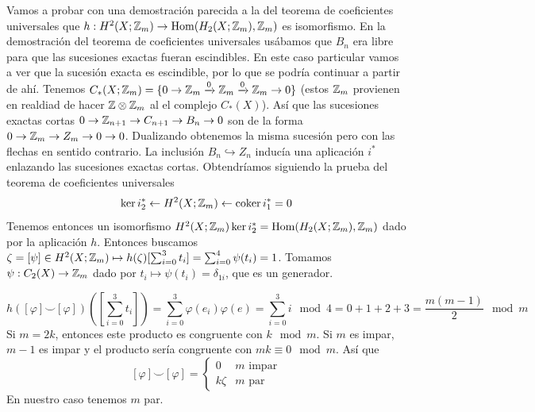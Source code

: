 \documentclass[TA.tex]{subfiles}
\begin{document}
\begin{ej}
Vamos a probar con una demostración parecida a la del teorema de coeficientes universales que $h:H^2(X;\mathbb{Z}_m)\to \operatorname{Hom}(H_2(X;\mathbb{Z}_m),\mathbb{Z}_m)$ es isomorfismo. En la demostración del teorema de coeficientes universales usábamos que $B_n$ era libre para que las sucesiones exactas fueran escindibles. En este caso particular vamos a ver que la sucesión exacta es escindible, por lo que se podría continuar a partir de ahí. Tenemos $C_*(X;\mathbb{Z}_m)=\{0\to \mathbb{Z}_m\xrightarrow{0} \mathbb{Z}_m\xrightarrow{0}\mathbb{Z}_m\to 0\}$ (estos $\mathbb{Z}_m$ provienen en realdiad de hacer $\mathbb{Z}\otimes\mathbb{Z}_m$ al el complejo $C_*(X)$). Así que las sucesiones exactas cortas $0\to\mathbb{Z}_{n+1}\to C_{n+1}\to B_n\to 0$ son de la forma $0\to\mathbb{Z}_m\to Z_m\to 0\to 0$. Dualizando obtenemos la misma sucesión pero con las flechas en sentido contrario. La inclusión $B_n\hookrightarrow Z_n$ inducía una aplicación $i^*$ enlazando las sucesiones exactas cortas. Obtendríamos siguiendo la prueba del teorema de coeficientes universales
\[
\ker i^*_2\leftarrow H^2(X;\mathbb{Z}_m)\leftarrow\operatorname{coker} i_1^*=0
\]
Tenemos entonces un isomorfismo $H^2(X;\mathbb{Z}_m)\ker i^*_2=\operatorname{Hom}(H_2(X;\mathbb{Z}_m),\mathbb{Z}_m)$ dado por la aplicación $h$. Entonces buscamos $\zeta=[\psi]\in H^2(X;\mathbb{Z}_m)\mapsto h(\zeta)[\sum_{i=0}^3t_i]=\sum_{i=0}^4\psi(t_i)=1$. Tomamos $\psi:C_2(X)\to\mathbb{Z}_m$ dado por $t_i\mapsto\psi(t_i)=\delta_{1i}$, que es un generador. 

\[
h([\varphi]\smile[\varphi])([\sum_{i=0}^3t_i])=\sum_{i=0}^3\varphi(e_i)\varphi(e)=\sum_{i=0}^3i\mod 4=0+1+2+3=\frac{m(m-1)}{2}\mod m
\]
Si $m=2k$, entonces este producto es congruente con $k\mod m$. Si $m$ es impar, $m-1$ es impar y el producto sería congruente con $mk\equiv 0\mod m$. Así que 
\[
[\varphi]\smile[\varphi]=\begin{cases}
0 & m\text{ impar}\\
k\zeta & m\text{ par}
\end{cases}
\]
En nuestro caso tenemos $m$ par. 
\end{ej}
\end{document}
